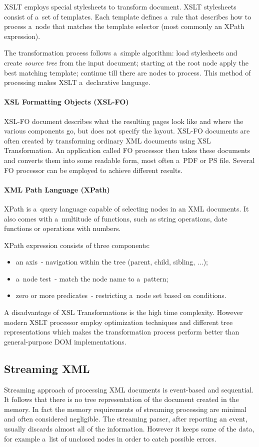\documentclass[11pt,oneside,final]{fithesis2}
\begin{document}
XSLT employs special stylesheets to transform document. XSLT stylesheets consist of a~set of templates. Each template defines a~rule that describes how to process a~node that matches the template selector (most commonly an XPath expression). 

The transformation process follows a~simple algorithm: load stylesheets and create \textit{source tree} from the input document; starting at the root node apply the best matching template; continue till there are nodes to process. This method of processing makes XSLT a~declarative language.

\paragraph*{XSL Formatting Objects (XSL-FO)}
\label{xsl:xsl-fo}
XSL-FO document describes what the resulting pages look like and where the various components go, but does not specify the layout. XSL-FO documents are often created by transforming ordinary XML documents using XSL Transformation. An application called FO processor then takes these documents and converts them into some readable form, most often a~PDF or PS file. Several FO processor can be employed to achieve different results.

\paragraph*{XML Path Language (XPath)}
\label{xsl:xpath}
XPath is a~query language capable of selecting nodes in an XML documents. It also comes with a~multitude of functions, such as string operations, date functions or operations with numbers. 

XPath expression consists of three components: 
\begin{itemize}
\item an axis~- navigation within the tree (parent, child, sibling, $\ldots$);
\item a~node test~- match the node name to a~pattern;
\item zero or more predicates~- restricting a~node set based on conditions.
\end{itemize}

A disadvantage of XSL Transformations is the high time complexity. However modern XSLT processor employ optimization techniques and different tree representations which makes the transformation process perform better than general-purpose DOM implementations.

\subsection{Streaming XML}
Streaming approach of processing XML documents is event-based and sequential. It follows that there is no tree representation of the document created in the memory. In fact the memory requirements of streaming processing are minimal and often considered negligible. The streaming parser, after reporting an event, usually discards almost all of the information. However it keeps some of the data, for example a~list of unclosed nodes in order to catch possible errors. 
\end{document}
